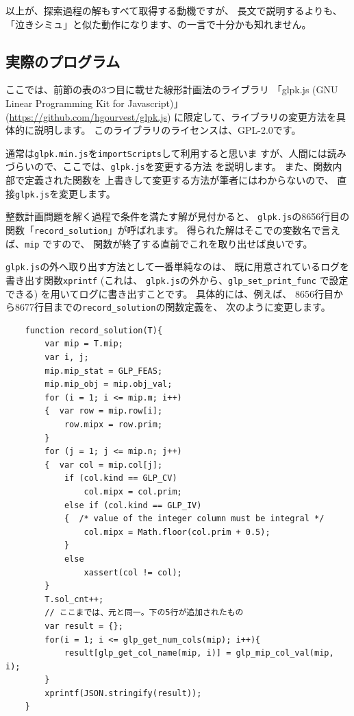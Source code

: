 \documentclass{jsarticle}
\begin{document}
以上が、探索過程の解もすべて取得する動機ですが、
長文で説明するよりも、
「泣きシミュ」と似た動作になります、の一言で十分かも知れません。

\subsection{実際のプログラム}
ここでは、前節の表の3つ目に載せた線形計画法のライブラリ
「glpk.js  (GNU Linear Programming Kit for Javascript)」
(\url{https://github.com/hgourvest/glpk.js})
に限定して、ライブラリの変更方法を具体的に説明します。
このライブラリのライセンスは、GPL-2.0です。

通常は\texttt{glpk.min.js}を\texttt{importScripts}して利用すると思いま
すが、人間には読みづらいので、ここでは、\texttt{glpk.js}を変更する方法
を説明します。
%
また、関数内部で定義された関数を
上書きして変更する方法が筆者にはわからないので、
直接\texttt{glpk.js}を変更します。

整数計画問題を解く過程で条件を満たす解が見付かると、
\texttt{glpk.js}の8656行目の関数「\texttt{record\_solution}」が呼ばれます。
得られた解はそこでの変数名で言えば、\texttt{mip} ですので、
関数が終了する直前でこれを取り出せば良いです。

\texttt{glpk.js}の外へ取り出す方法として一番単純なのは、
既に用意されているログを書き出す関数\texttt{xprintf}
(これは、 \texttt{glpk.js}の外から、\texttt{glp\_set\_print\_func}
で設定できる)
を用いてログに書き出すことです。
具体的には、例えば、
8656行目から8677行目までの\texttt{record\_solution}の関数定義を、
次のように変更します。

\begin{verbatim}
    function record_solution(T){
        var mip = T.mip;
        var i, j;
        mip.mip_stat = GLP_FEAS;
        mip.mip_obj = mip.obj_val;
        for (i = 1; i <= mip.m; i++)
        {  var row = mip.row[i];
            row.mipx = row.prim;
        }
        for (j = 1; j <= mip.n; j++)
        {  var col = mip.col[j];
            if (col.kind == GLP_CV)
                col.mipx = col.prim;
            else if (col.kind == GLP_IV)
            {  /* value of the integer column must be integral */
                col.mipx = Math.floor(col.prim + 0.5);
            }
            else
                xassert(col != col);
        }
        T.sol_cnt++;
        // ここまでは、元と同一。下の5行が追加されたもの
        var result = {};
        for(i = 1; i <= glp_get_num_cols(mip); i++){
            result[glp_get_col_name(mip, i)] = glp_mip_col_val(mip, i);
        }
        xprintf(JSON.stringify(result));
    }
\end{verbatim}
\end{document}
